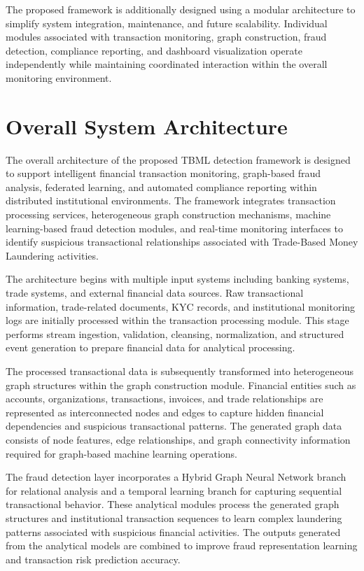 The proposed framework is additionally designed using a modular architecture to simplify system integration, maintenance, and future scalability. Individual modules associated with transaction monitoring, graph construction, fraud detection, compliance reporting, and dashboard visualization operate independently while maintaining coordinated interaction within the overall monitoring environment.


\section[Overall System Architecture]{\textbf{Overall System Architecture}}

The overall architecture of the proposed TBML detection framework is designed to support intelligent financial transaction monitoring, graph-based fraud analysis, federated learning, and automated compliance reporting within distributed institutional environments. The framework integrates transaction processing services, heterogeneous graph construction mechanisms, machine learning-based fraud detection modules, and real-time monitoring interfaces to identify suspicious transactional relationships associated with Trade-Based Money Laundering activities.

The architecture begins with multiple input systems including banking systems, trade systems, and external financial data sources. Raw transactional information, trade-related documents, KYC records, and institutional monitoring logs are initially processed within the transaction processing module. This stage performs stream ingestion, validation, cleansing, normalization, and structured event generation to prepare financial data for analytical processing.

The processed transactional data is subsequently transformed into heterogeneous graph structures within the graph construction module. Financial entities such as accounts, organizations, transactions, invoices, and trade relationships are represented as interconnected nodes and edges to capture hidden financial dependencies and suspicious transactional patterns. The generated graph data consists of node features, edge relationships, and graph connectivity information required for graph-based machine learning operations.

The fraud detection layer incorporates a Hybrid Graph Neural Network branch for relational analysis and a temporal learning branch for capturing sequential transactional behavior. These analytical modules process the generated graph structures and institutional transaction sequences to learn complex laundering patterns associated with suspicious financial activities. The outputs generated from the analytical models are combined to improve fraud representation learning and transaction risk prediction accuracy.

